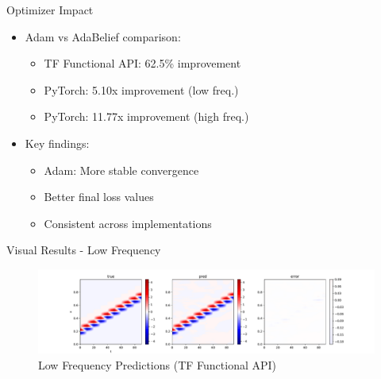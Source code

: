 \documentclass{beamer}
\begin{document}

\begin{frame}{Optimizer Impact}
    \begin{itemize}
        \item Adam vs AdaBelief comparison:
        \begin{itemize}
            \item TF Functional API: 62.5\% improvement
            \item PyTorch: 5.10x improvement (low freq.)
            \item PyTorch: 11.77x improvement (high freq.)
        \end{itemize}
        \item Key findings:
        \begin{itemize}
            \item Adam: More stable convergence
            \item Better final loss values
            \item Consistent across implementations
        \end{itemize}
    \end{itemize}
\end{frame}

\begin{frame}{Visual Results - Low Frequency}
    \begin{figure}
        \includegraphics[width=\textwidth]{functional/low-frequency-adam-20250206-1105-1/vis}
        \caption{Low Frequency Predictions (TF Functional API)}
    \end{figure}
\end{frame}
\end{document}
